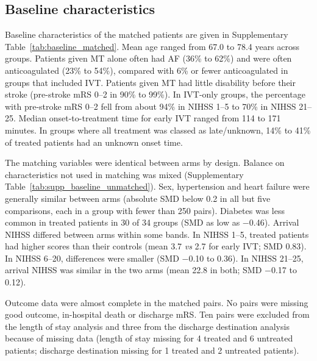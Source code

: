 \subsection*{Baseline characteristics}

Baseline characteristics of the matched patients are given in Supplementary Table~\ref{tab:baseline_matched}. Mean age ranged from 67.0 to 78.4 years across groups. Patients given MT alone often had AF (36\% to 62\%) and were often anticoagulated (23\% to 54\%), compared with 6\% or fewer anticoagulated in groups that included IVT. Patients given MT had little disability before their stroke (pre-stroke mRS 0--2 in 90\% to 99\%). In IVT-only groups, the percentage with pre-stroke mRS 0--2 fell from about 94\% in NIHSS 1--5 to 70\% in NIHSS 21--25. Median onset-to-treatment time for early IVT ranged from 114 to 171 minutes. In groups where all treatment was classed as late/unknown, 14\% to 41\% of treated patients had an unknown onset time.

The matching variables were identical between arms by design. Balance on characteristics not used in matching was mixed (Supplementary Table~\ref{tab:supp_baseline_unmatched}). Sex, hypertension and heart failure were generally similar between arms (absolute SMD below 0.2 in all but five comparisons, each in a group with fewer than 250 pairs). Diabetes was less common in treated patients in 30 of 34 groups (SMD as low as $-$0.46). Arrival NIHSS differed between arms within some bands. In NIHSS 1--5, treated patients had higher scores than their controls (mean 3.7 \textit{vs} 2.7 for early IVT; SMD 0.83). In NIHSS 6--20, differences were smaller (SMD $-$0.10 to 0.36). In NIHSS 21--25, arrival NIHSS was similar in the two arms (mean 22.8 in both; SMD $-$0.17 to 0.12).

Outcome data were almost complete in the matched pairs. No pairs were missing good outcome, in-hospital death or discharge mRS. Ten pairs were excluded from the length of stay analysis and three from the discharge destination analysis because of missing data (length of stay missing for 4 treated and 6 untreated patients; discharge destination missing for 1 treated and 2 untreated patients).

